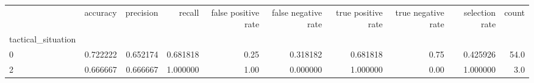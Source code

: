 \begin{tabular}{lrrrrrrrrr}
\toprule
{} &  accuracy &  precision &    recall &  false positive rate &  false negative rate &  true positive rate &  true negative rate &  selection rate &  count \\
tactical\_situation &           &            &           &                      &                      &                     &                     &                 &        \\
\midrule
0                  &  0.722222 &   0.652174 &  0.681818 &                 0.25 &             0.318182 &            0.681818 &                0.75 &        0.425926 &   54.0 \\
2                  &  0.666667 &   0.666667 &  1.000000 &                 1.00 &             0.000000 &            1.000000 &                0.00 &        1.000000 &    3.0 \\
\bottomrule
\end{tabular}

